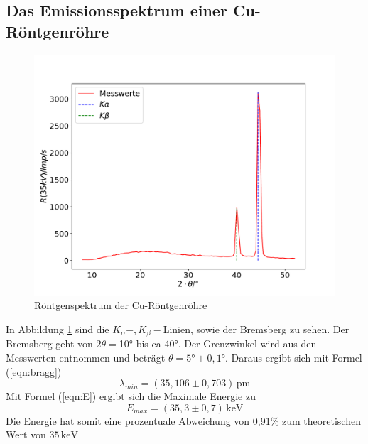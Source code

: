 \subsection{Das Emissionsspektrum einer Cu-Röntgenröhre}
\begin{figure}[H]
  \centering
  \includegraphics[width=\textwidth]{cu2.pdf}
  \caption{Röntgenspektrum der Cu-Röntgenröhre}
  \label{fig:cu}
\end{figure}
In Abbildung \ref{fig:cu} sind die $K_{\alpha}-, K_{\beta}-$Linien,
sowie der Bremsberg zu sehen.
Der Bremsberg geht von $2\theta =$10° bis ca 40°.
Der Grenzwinkel wird aus den Messwerten entnommen und beträgt $\theta = 5°\pm 0,1°$.
Daraus ergibt sich mit Formel (\ref{eqn:bragg})
\begin{equation*}
  \lambda_{min}= (35,106\pm 0,703) \, \mathrm{pm}
\end{equation*}
Mit Formel (\ref{eqn:E}) ergibt sich die Maximale Energie zu
\begin{equation*}
  E_{max} = (35,3 \pm 0,7)\, \mathrm{keV}
\end{equation*}
Die Energie hat somit eine prozentuale Abweichung von 0,91\%
zum theoretischen Wert von $35\, \mathrm{keV}$

